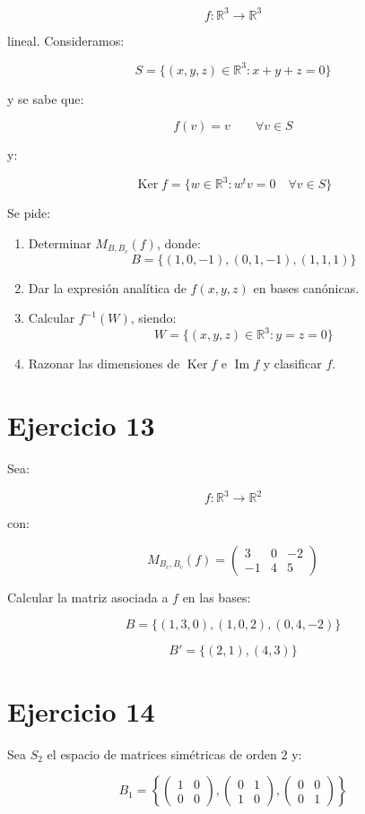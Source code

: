\documentclass[11pt,a4paper]{article}
\newcommand{\R}{\mathbb{R}}
\newcommand{\Ker}{\operatorname{Ker}}
\newcommand{\Ima}{\operatorname{Im}}
\begin{document}
\[
f:\R^3\longrightarrow\R^3
\]

lineal. Consideramos:

\[
S=
\{(x,y,z)\in\R^3:x+y+z=0\}
\]

y se sabe que:

\[
f(v)=v
\qquad
\forall v\in S
\]

y:

\[
\Ker f=
\{w\in\R^3:w^tv=0\quad\forall v\in S\}
\]

Se pide:

\begin{enumerate}[label=\alph*)]
	\item Determinar $M_{B,B_c}(f)$, donde:
	\[
	B=\{(1,0,-1),(0,1,-1),(1,1,1)\}
	\]
	\item Dar la expresión analítica de $f(x,y,z)$ en bases canónicas.
	\item Calcular $f^{-1}(W)$, siendo:
	\[
	W=\{(x,y,z)\in\R^3:y=z=0\}
	\]
	\item Razonar las dimensiones de $\Ker f$ e $\Ima f$ y clasificar $f$.
\end{enumerate}

\section{Ejercicio 13}
Sea:

\[
f:\R^3\longrightarrow\R^2
\]

con:

\[
M_{B_c,B_c}(f)
=
\begin{pmatrix}
3&0&-2\\
-1&4&5
\end{pmatrix}
\]

Calcular la matriz asociada a $f$ en las bases:

\[
B=
\{(1,3,0),(1,0,2),(0,4,-2)\}
\]

\[
B'=
\{(2,1),(4,3)\}
\]

\section{Ejercicio 14}
Sea $S_2$ el espacio de matrices simétricas de orden $2$ y:

\[
B_1=
\left\{
\begin{pmatrix}1&0\\0&0\end{pmatrix},
\begin{pmatrix}0&1\\1&0\end{pmatrix},
\begin{pmatrix}0&0\\0&1\end{pmatrix}
\right\}
\]
\end{document}
